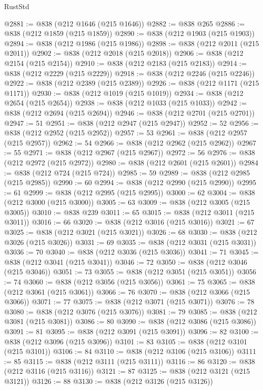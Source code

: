 \begin{lexlean}{RustStd}
\begin{coremodule}
@2881 := @838 (@212 @1646 (@215 @1646))
@2882 := @838 @265
@2886 := @838 (@212 @1859 (@215 @1859))
@2890 := @838 (@212 @1903 (@215 @1903))
@2894 := @838 (@212 @1986 (@215 @1986))
@2898 := @838 (@212 @2011 (@215 @2011))
@2902 := @838 (@212 @2018 (@215 @2018))
@2906 := @838 (@212 @2154 (@215 @2154))
@2910 := @838 (@212 @2183 (@215 @2183))
@2914 := @838 (@212 @2229 (@215 @2229))
@2918 := @838 (@212 @2246 (@215 @2246))
@2922 := @838 (@212 @2389 (@215 @2389))
@2926 := @838 (@212 @1171 (@215 @1171))
@2930 := @838 (@212 @1019 (@215 @1019))
@2934 := @838 (@212 @2654 (@215 @2654))
@2938 := @838 (@212 @1033 (@215 @1033))
@2942 := @838 (@212 @2694 (@215 @2694))
@2946 := @838 (@212 @2701 (@215 @2701))
@2947 := 51
@2951 := @838 (@212 @2947 (@215 @2947))
@2952 := 52
@2956 := @838 (@212 @2952 (@215 @2952))
@2957 := 53
@2961 := @838 (@212 @2957 (@215 @2957))
@2962 := 54
@2966 := @838 (@212 @2962 (@215 @2962))
@2967 := 55
@2971 := @838 (@212 @2967 (@215 @2967))
@2972 := 56
@2976 := @838 (@212 @2972 (@215 @2972))
@2980 := @838 (@212 @2601 (@215 @2601))
@2984 := @838 (@212 @724 (@215 @724))
@2985 := 59
@2989 := @838 (@212 @2985 (@215 @2985))
@2990 := 60
@2994 := @838 (@212 @2990 (@215 @2990))
@2995 := 61
@2999 := @838 (@212 @2995 (@215 @2995))
@3000 := 62
@3004 := @838 (@212 @3000 (@215 @3000))
@3005 := 63
@3009 := @838 (@212 @3005 (@215 @3005))
@3010 := @838 @239
@3011 := 65
@3015 := @838 (@212 @3011 (@215 @3011))
@3016 := 66
@3020 := @838 (@212 @3016 (@215 @3016))
@3021 := 67
@3025 := @838 (@212 @3021 (@215 @3021))
@3026 := 68
@3030 := @838 (@212 @3026 (@215 @3026))
@3031 := 69
@3035 := @838 (@212 @3031 (@215 @3031))
@3036 := 70
@3040 := @838 (@212 @3036 (@215 @3036))
@3041 := 71
@3045 := @838 (@212 @3041 (@215 @3041))
@3046 := 72
@3050 := @838 (@212 @3046 (@215 @3046))
@3051 := 73
@3055 := @838 (@212 @3051 (@215 @3051))
@3056 := 74
@3060 := @838 (@212 @3056 (@215 @3056))
@3061 := 75
@3065 := @838 (@212 @3061 (@215 @3061))
@3066 := 76
@3070 := @838 (@212 @3066 (@215 @3066))
@3071 := 77
@3075 := @838 (@212 @3071 (@215 @3071))
@3076 := 78
@3080 := @838 (@212 @3076 (@215 @3076))
@3081 := 79
@3085 := @838 (@212 @3081 (@215 @3081))
@3086 := 80
@3090 := @838 (@212 @3086 (@215 @3086))
@3091 := 81
@3095 := @838 (@212 @3091 (@215 @3091))
@3096 := 82
@3100 := @838 (@212 @3096 (@215 @3096))
@3101 := 83
@3105 := @838 (@212 @3101 (@215 @3101))
@3106 := 84
@3110 := @838 (@212 @3106 (@215 @3106))
@3111 := 85
@3115 := @838 (@212 @3111 (@215 @3111))
@3116 := 86
@3120 := @838 (@212 @3116 (@215 @3116))
@3121 := 87
@3125 := @838 (@212 @3121 (@215 @3121))
@3126 := 88
@3130 := @838 (@212 @3126 (@215 @3126))

\end{coremodule}
\end{lexlean}
